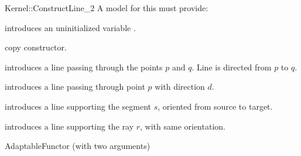 \begin{ccRefFunctionObjectConcept}{Kernel::ConstructLine_2}
A model for this must provide:


\ccHidden {}
             {introduces an uninitialized variable .}

\ccHidden {}
            {copy constructor.}

            {introduces a line  passing through the points $p$ and $q$. 
             Line  is directed from $p$ to $q$.}

            {introduces a line  passing through point $p$ with 
             direction $d$.}

            {introduces a line  supporting the segment $s$,
            oriented from source to target.}

            {introduces a line  supporting the ray $r$,
            with same orientation.}

\ccRefines
AdaptableFunctor (with two arguments)

\ccSeeAlso
{}  \\

\end{ccRefFunctionObjectConcept}
